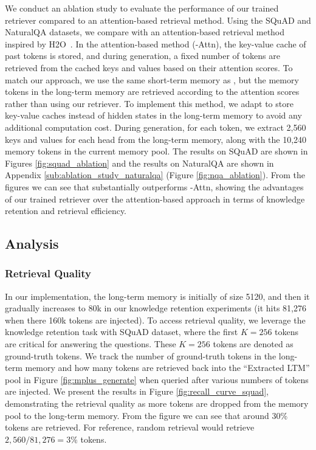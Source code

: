 We conduct an ablation study to evaluate the performance of our trained retriever compared to an attention-based retrieval method. Using the SQuAD and NaturalQA datasets, we compare \ours with an attention-based retrieval method inspired by H2O~\citep{h2o}. In the attention-based method (\ours-Attn), the key-value cache of past tokens is stored, and during generation, a fixed number of tokens are retrieved from the cached keys and values based on their attention scores. To match our approach, we use the same short-term memory as \ours, but the memory tokens in the long-term memory are retrieved according to the attention scores rather than using our retriever. To implement this method, we adapt \ours to store key-value caches instead of hidden states in the long-term memory to avoid any additional computation cost. During generation, for each token, we extract 2,560 keys and values for each head from the long-term memory, along with the 10,240 memory tokens in the current memory pool. The results on SQuAD are shown in  Figures \ref{fig:squad_ablation} and the results on NaturalQA are shown in Appendix \ref{sub:ablation_study_naturalqa} (Figure \ref{fig:nqa_ablation}). From the figures we can see that \ours substantially outperforms \ours-Attn, showing the advantages of our trained retriever over the attention-based approach in terms of knowledge retention and retrieval efficiency. 


\vspace{-5pt}
\subsection{Analysis}
\vspace{-3pt}
\subsubsection{Retrieval Quality}
\vspace{-3pt}
In our implementation, the long-term memory is initially of size 5120, and then it gradually increases to 80k in our knowledge retention experiments (it hits 81,276 when there 160k tokens are injected). To access retrieval quality, we leverage the knowledge retention task with SQuAD dataset, where the first $K=256$ tokens are critical for answering the questions. These $K=256$ tokens are denoted as ground-truth tokens. We track the number of ground-truth tokens in the long-term memory and how many tokens are retrieved back into the ``Extracted LTM'' pool in Figure \ref{fig:mplus_generate} when queried after various numbers of tokens are injected. We present the results in Figure \ref{fig:recall_curve_squad}, demonstrating the retrieval quality as more tokens are dropped from the memory pool to the long-term memory. From the figure we can see that around 30\% tokens are retrieved. For reference, random retrieval would retrieve $2,560/81,276 = 3\%$ tokens. 


